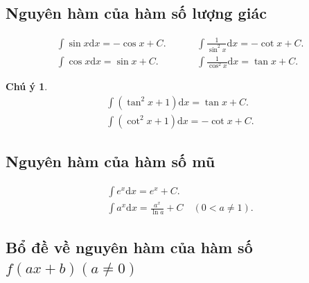 \documentclass[12pt,a4paper,oneside]{book}
\theoremstyle{theorem}
\theoremstyle{definition}
\newtheorem{cy}[theorem2]{Chú ý}
\begin{document}
\subsection{Nguyên hàm của hàm số lượng giác}
    \[
\begin{array}{rcccl}
\displaystyle\int \sin x \mathrm{d}x = -\cos x + C. & & & & \displaystyle\int \frac{1}{\sin^2 x}\mathrm{d}x = -\cot x + C. \\[0.4cm]
\displaystyle\int \cos x \mathrm{d}x = \sin x + C. & & & & \displaystyle\int \frac{1}{\cos^2 x}\mathrm{d}x = \tan x + C.
\end{array}
\]

\begin{cy}
    \[
\begin{array}{l}
\displaystyle\int (\tan^2 x + 1)\mathrm{d}x = \tan x + C. \\[0.3cm]
\displaystyle\int (\cot^2 x + 1)\mathrm{d}x = -\cot x + C.
\end{array}
\]
\end{cy}
\subsection{Nguyên hàm của hàm số mũ}
\[
\begin{array}{c}
\displaystyle\int e^x \mathrm{d}x = e^x + C. \\[0.3cm]
\displaystyle\int a^x \mathrm{d}x = \frac{a^x}{\ln a} + C \quad (0 < a \neq 1).
\end{array}
\]
\subsection{Bổ đề về nguyên hàm của hàm số $f(ax + b) (a \neq 0)$} 
\end{document}
